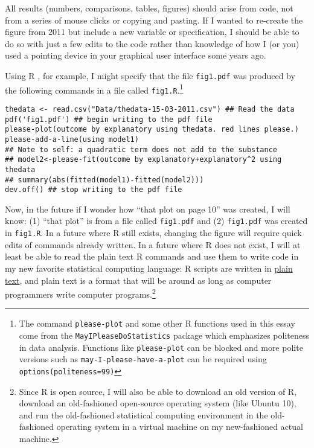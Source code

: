 \documentclass[12pt]{article}
\begin{document}
All results (numbers, comparisons, tables, figures) should arise from
code, not from a series of mouse clicks or copying and pasting. If I wanted
to re-create the figure from 2011 but include a new variable or
specification, I should be able to do so with just a few edits to the
code rather than knowledge of how I (or you) used a pointing device in
your graphical user interface some years ago.

Using R \citep{R:2011}, for example, I might specify that the file
\Verb+fig1.pdf+ was produced by the following commands in a file
called \Verb+fig1.R+.\footnote{The command \Verb+please-plot+ and some
  other R functions used in this essay come from the
  \Verb+MayIPleaseDoStatistics+ package which emphasizes politeness in
  data analysis. Functions like \Verb+please-plot+ can be blocked and
  more polite versions such as \Verb+may-I-please-have-a-plot+ can be
  required using \Verb+options(politeness=99)+ }

\begin{Verbatim}[fontsize=\footnotesize]
thedata <- read.csv("Data/thedata-15-03-2011.csv") ## Read the data
pdf('fig1.pdf') ## begin writing to the pdf file
please-plot(outcome by explanatory using thedata. red lines please.)
please-add-a-line(using model1)
## Note to self: a quadratic term does not add to the substance
## model2<-please-fit(outcome by explanatory+explanatory^2 using thedata
## summary(abs(fitted(model1)-fitted(model2)))
dev.off() ## stop writing to the pdf file
\end{Verbatim}


Now, in the future if I wonder how ``that plot on page 10'' was
created, I will know: (1) ``that plot'' is from a file called
\Verb+fig1.pdf+ and (2) \Verb+fig1.pdf+ was created in
\Verb+fig1.R+. In a future where R still exists, changing the figure
will require quick edits of commands already written.  In a future
where R does not exist, I will at least be able to read the plain text
R commands and use them to write code in my new favorite statistical
computing language: R scripts are written in
\href{http://en.wikipedia.org/wiki/Plain_text}{plain text}, and plain
text is a format that will be around as long as computer programmers
write computer programs.\footnote{Since R is open
  source, I will also be able to download an old version of R, download an
  old-fashioned open-source operating system (like Ubuntu 10), and
  run the old-fashioned statistical computing environment in the
  old-fashioned operating system in a virtual machine on my
  new-fashioned actual machine.}
\end{document}
